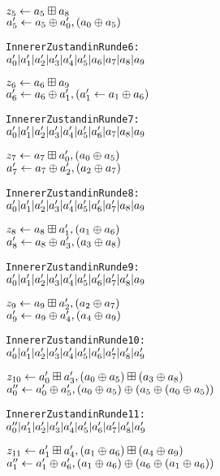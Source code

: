 \documentclass[a4paper,12pt]{article}
\begin{document}
\begin{appendix}
\begin{alltt}
\( z\sb{5} \leftarrow a\sb{5} \boxplus a\sb{8}\)
\( a'\sb{5} \leftarrow a\sb{5} \oplus a'\sb{0} , (a\sb{0} \oplus a\sb{5}) \) 

Innerer Zustand in Runde 6:
\( a'\sb{0} | a'\sb{1} | a'\sb{2} | a'\sb{3} | a'\sb{4} | a'\sb{5} | a\sb{6} | a\sb{7} | a\sb{8} | a\sb{9} \)

\( z\sb{6} \leftarrow a\sb{6} \boxplus a\sb{9}\)
\( a'\sb{6} \leftarrow a\sb{6} \oplus a'\sb{1} , (a'\sb{1} \leftarrow a\sb{1} \oplus a\sb{6}) \) 

Innerer Zustand in Runde 7:
\( a'\sb{0} | a'\sb{1} | a'\sb{2} | a'\sb{3} | a'\sb{4} | a'\sb{5} | a'\sb{6} | a\sb{7} | a\sb{8} | a\sb{9} \)

\( z\sb{7} \leftarrow a\sb{7} \boxplus a'\sb{0} , (a\sb{0} \oplus a\sb{5}) \)
\( a'\sb{7} \leftarrow a\sb{7} \oplus a'\sb{2} , (a\sb{2} \oplus a\sb{7}) \) 

Innerer Zustand in Runde 8:
\( a'\sb{0} | a'\sb{1} | a'\sb{2} | a'\sb{3} | a'\sb{4} | a'\sb{5} | a'\sb{6} | a'\sb{7} | a\sb{8} | a\sb{9} \)

\( z\sb{8} \leftarrow a\sb{8} \boxplus a'\sb{1} , (a\sb{1} \oplus a\sb{6}) \)
\( a'\sb{8} \leftarrow a\sb{8} \oplus a'\sb{3} , (a\sb{3} \oplus a\sb{8}) \) 

Innerer Zustand in Runde 9:
\( a'\sb{0} | a'\sb{1} | a'\sb{2} | a'\sb{3} | a'\sb{4} | a'\sb{5} | a'\sb{6} | a'\sb{7} | a'\sb{8} | a\sb{9} \)

\( z\sb{9} \leftarrow a\sb{9} \boxplus a'\sb{2} , (a\sb{2} \oplus a\sb{7}) \)
\( a'\sb{9} \leftarrow a\sb{9} \oplus a'\sb{4} , (a\sb{4} \oplus a\sb{9}) \) 

Innerer Zustand in Runde 10:
\( a'\sb{0} | a'\sb{1} | a'\sb{2} | a'\sb{3} | a'\sb{4} | a'\sb{5} | a'\sb{6} | a'\sb{7} | a'\sb{8} | a'\sb{9} \)

\( z\sb{10} \leftarrow a'\sb{0} \boxplus a'\sb{3} , (a\sb{0} \oplus a\sb{5}) \boxplus (a\sb{3} \oplus a\sb{8}) \)
\( a''\sb{0} \leftarrow a'\sb{0} \oplus a'\sb{5} , (a\sb{0} \oplus a\sb{5}) \oplus (a\sb{5} \oplus (a\sb{0} \oplus a\sb{5})) \) 

Innerer Zustand in Runde 11:
\( a''\sb{0} | a'\sb{1} | a'\sb{2} | a'\sb{3} | a'\sb{4} | a'\sb{5} | a'\sb{6} | a'\sb{7} | a'\sb{8} | a'\sb{9} \)

\( z\sb{11} \leftarrow a'\sb{1} \boxplus a'\sb{4} , (a\sb{1} \oplus a\sb{6}) \boxplus (a\sb{4} \oplus a\sb{9}) \)
\( a''\sb{1} \leftarrow a'\sb{1} \oplus a'\sb{6} , (a\sb{1} \oplus a\sb{6}) \oplus (a\sb{6} \oplus (a\sb{1} \oplus a\sb{6})) \) 


\end{alltt}
\end{appendix}
\end{document}
